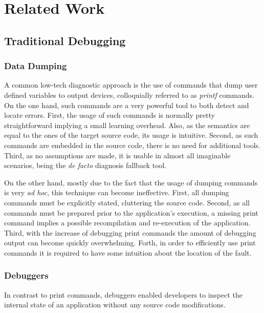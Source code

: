 \renewcommand{\BrainFuckChapter}{%
  {-}{[}{-}{-}{-}{>}{+}{<}{]}{>}{-}{-}{-}{.}{+}{[}{-}{-}{-}{-}{-}{>}{+}{+}{+}{<}{]}{>}{.}{+}{+}{+}{+}{+}{+}{+}{.}{-}{-}{-}{-}{-}{-}{-}{-}{-}{-}{-}{.}{-}{-}{[}{-}{-}{-}{>}{+}{<}{]}{>}{-}{.}{+}{+}{+}{[}{-}{>}{+}{+}
  {+}{<}{]}{>}{.}{-}{.}{-}{[}{-}{-}{-}{>}{+}{<}{]}{>}{-}{.}{-}{-}{-}{[}{-}{>}{+}{+}{+}{<}{]}{>}{.}{-}{[}{-}{-}{-}{>}{+}{<}{]}{>}{-}{-}{-}{.}{+}{+}{+}{.}{-}{-}{-}{-}{-}{-}{-}{.}{-}{+}{>}{+}{<}{+}{>}{<}{+}{-}{+}{-}
}
\renewcommand{\LifeChapter}{y}

\chapter{Related Work}
\label{ch:related-work}
\section{Traditional Debugging}
\subsection*{Data Dumping}

A common low-tech diagnostic approach is the use of commands that dump
user defined variables to output devices, colloquially referred to as
\emph{printf} commands.
%
On the one hand, such commands are a very powerful tool to both detect
and locate errors.  First, the usage of such commands is normally
pretty straightforward implying a small learning overhead.
%
Also, as the semantics are equal to the ones of the target source
code, its usage is intuitive.
%
Second, as such commands are embedded in the source code, there is no
need for additional tools.
%
Third, as no assumptions are made, it is usable in almost all
imaginable scenarios, being the \textit{de facto} diagnosis fallback
tool.

On the other hand, mostly due to the fact that the usage of dumping
commands is very \textit{ad hoc}, this technique can become
ineffective.
%
First, all dumping commands must be explicitly stated, cluttering the
source code.
%
Second, as all commands must be prepared prior to the application's
execution, a missing print command implies a possible recompilation
and re-execution of the application.
%
Third, with the increase of debugging print commands the amount of
debugging output can become quickly overwhelming.
%
Forth, in order to efficiently use print commands it is required to
have some intuition about the location of the fault.

\subsection*{Debuggers}
In contrast to print commands, debuggers enabled developers to inspect
the internal state of an application without any source code
modifications.

